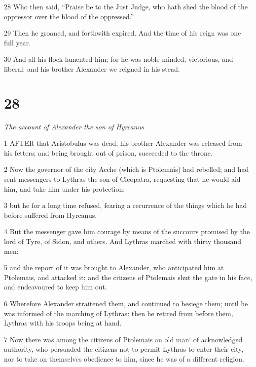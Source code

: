 \par 28 Who then said, “Praise be to the Just Judge, who hath shed the blood of the oppressor over the blood of the oppressed.” 

\par 29 Then he groaned, and forthwith expired. And the time of his reign was one full year. 

\par 30 And all his flock lamented him; for he was noble-minded, victorious, and liberal: and his brother Alexander we reigned in his stead. 

\chapter{28}

\par \textit{The account of Alexander the son of Hyrcanus}

\par 1 AFTER that Aristobulus was dead, his brother Alexander was released from his fetters; and being brought out of prison, succeeded to the throne. 

\par 2 Now the governor of the city Acche (which is Ptolemais) had rebelled; and had sent messengers to Lythras the son of Cleopatra, requesting that he would aid him, and take him under his protection; 

\par 3 but he for a long time refused, fearing a recurrence of the things which he had before suffered from Hyrcanus. 

\par 4 But the messenger gave him courage by means of the succours promised by the lord of Tyre, of Sidon, and others. And Lythras marched with thirty thousand men: 

\par 5 and the report of it was brought to Alexander, who anticipated him at Ptolemais, and attacked it; and the citizens of Ptolemais shut the gate in his face, and endeavoured to keep him out. 

\par 6 Wherefore Alexander straitened them, and continued to besiege them; until he was informed of the marching of Lythras: then he retired from before them, Lythras with his troops being at hand. 

\par 7 Now there was among the citizens of Ptolemais an old man‘ of acknowledged authority, who persuaded the citizens not to permit Lythras to enter their city, nor to take on themselves obedience to him, since he was of a different religion. 

